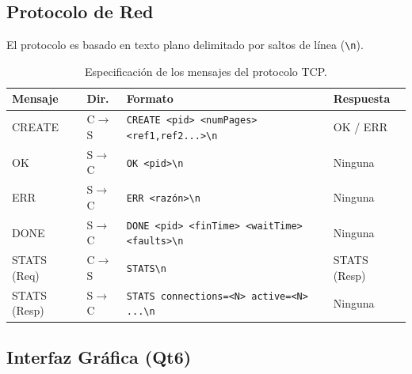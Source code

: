 \documentclass[12pt,letterpaper]{article}
\begin{document}
\subsection{Protocolo de Red}

El protocolo es basado en texto plano delimitado por saltos de línea (\texttt{\textbackslash n}).
\begin{table}[H]
\centering
{}
\begin{tabularx}{\textwidth}{@{}l l X l@{}}
\toprule
\rowcolor{catBlue!40}
\textbf{Mensaje} & \textbf{Dir.} & \textbf{Formato} & \textbf{Respuesta} \\ \midrule
CREATE & C$\rightarrow$S & \texttt{CREATE <pid> <numPages> <ref1,ref2...>\textbackslash n} & OK / ERR \\
OK & S$\rightarrow$C & \texttt{OK <pid>\textbackslash n} & Ninguna \\
ERR & S$\rightarrow$C & \texttt{ERR <razón>\textbackslash n} & Ninguna \\
DONE & S$\rightarrow$C & \texttt{DONE <pid> <finTime> <waitTime> <faults>\textbackslash n} & Ninguna \\
STATS (Req) & C$\rightarrow$S & \texttt{STATS\textbackslash n} & STATS (Resp) \\
STATS (Resp) & S$\rightarrow$C & \texttt{STATS connections=<N> active=<N> ...\textbackslash n} & Ninguna \\ \bottomrule
\end{tabularx}
\caption{Especificación de los mensajes del protocolo TCP.}
\end{table}

\subsection{Interfaz Gráfica (Qt6)}
\end{document}
